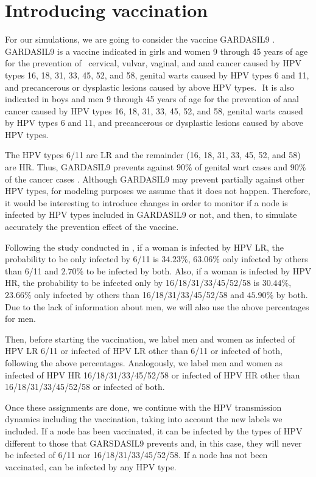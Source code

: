 \section{Introducing vaccination} 
For our simulations, we are going to consider the vaccine GARDASIL9 \cite{gardasil9}. GARDASIL9 is a vaccine indicated in girls and women 9 through 45 years of age for the prevention of  cervical, vulvar, vaginal, and anal cancer caused by HPV types 16, 18, 31, 33, 45, 52, and 58,  genital warts caused by HPV types 6 and 11, and precancerous or dysplastic lesions caused by above HPV types.  It is also indicated in boys and men 9 through 45 years of age for the prevention of anal cancer caused by HPV types 16, 18, 31, 33, 45, 52, and 58, genital warts caused by HPV types 6 and 11, and precancerous or dysplastic lesions caused by above HPV types.

The HPV types 6/11 are LR and the remainder (16, 18, 31, 33, 45, 52, and 58) are HR. Thus, GARDASIL9 prevents against $90\%$ of genital wart cases and $90\%$ of the cancer cases \cite{Hartwig2015}. Although GARDASIL9 may prevent partially against other HPV types, for modeling purposes we assume that it does not happen. Therefore, it would be interesting to introduce changes in order to monitor if a node is infected by HPV types included in GARDASIL9 or not, and then, to simulate accurately the prevention effect of the vaccine.

Following the study conducted in \cite{castellsague2012prevalence}, if a woman is infected by HPV LR, the probability to be only infected by 6/11 is $34.23\%$, $63.06\%$ only infected by others than 6/11 and $2.70\%$ to be infected by both. Also, if a woman is infected by HPV HR, the probability to be infected only by 16/18/31/33/45/52/58 is $30.44\%$, $23.66\%$ only infected by others than 16/18/31/33/45/52/58 and $45.90\%$ by both. Due to the lack of information about men, we will also use the above percentages for men.

Then, before starting the vaccination, we label men and women as infected of HPV LR 6/11 or infected of HPV LR other than 6/11 or infected of both, following the above percentages. Analogously, we label men and women as infected of HPV HR 16/18/31/33/45/52/58 or infected of HPV HR other than 16/18/31/33/45/52/58 or infected of both.

Once these assignments are done, we continue with the HPV transmission dynamics including the vaccination, taking into account the new labels we included. If a node has been vaccinated, it can be infected by the types of HPV different to those that GARSDASIL9 prevents and, in this case, they will never be infected of 6/11 nor 16/18/31/33/45/52/58. If a node has not been vaccinated, can be infected by any HPV type. 

